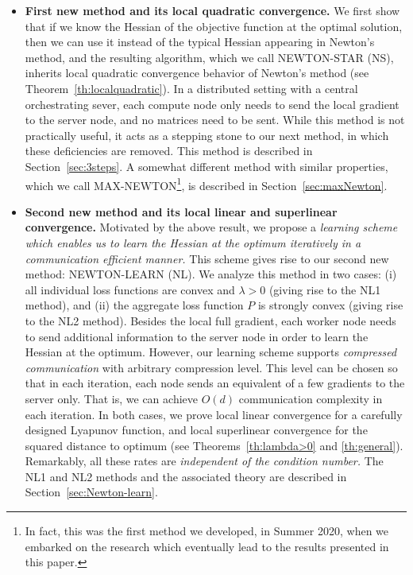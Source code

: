 \documentclass[10pt]{article}
\begin{document}
\begin{itemize}
\item {\bf First new method and its local quadratic convergence.} We first show that if we know the Hessian of the objective function at   the optimal solution, then we can use it instead of the typical Hessian appearing in Newton's method, and the resulting algorithm, which we call {\sf NEWTON-STAR (NS)}, inherits  local quadratic convergence behavior of Newton's method (see Theorem~\ref{th:localquadratic}). In a distributed setting with a central orchestrating sever, each compute node only needs to send the local  gradient  to the server  node, and no matrices need to be sent. While this method is not practically useful, it acts as a stepping stone to our next method, in which these deficiencies are removed. This method is described in Section~\ref{sec:3steps}. A somewhat different method with similar properties, which we call {\sf MAX-NEWTON}\footnote{In fact, this was the first method we developed, in Summer 2020, when we embarked on the research which eventually lead to the results presented in this paper.}, is described in Section~\ref{sec:maxNewton}. 

\item  {\bf Second new method and its local linear and superlinear convergence.} Motivated by the above result, we propose a {\em learning scheme which enables us to learn the Hessian at the optimum iteratively  in a communication efficient manner.} This scheme gives rise to our second new method: {\sf NEWTON-LEARN (NL)}. We analyze this method in two cases: (i) all individual loss functions are convex and $\lambda >0$ (giving rise to the {\sf NL1} method), and (ii) the aggregate loss function $P$ is strongly convex (giving rise to the {\sf NL2} method). Besides the local full gradient, each worker node needs to send additional information to the server node in order to learn the Hessian at the optimum. However, our learning  scheme supports {\em compressed communication} with arbitrary compression level. This level can be chosen so that in each iteration, each node sends an equivalent of a few gradients to the server only. That is, we can achieve $O(d)$ communication complexity in each iteration. In both cases, we prove local linear convergence for a carefully designed Lyapunov function, and  local superlinear convergence for the squared distance to optimum (see Theorems~\ref{th:lambda>0} and \ref{th:general}). Remarkably, all these rates are {\em independent of the condition number.} The {\sf NL1} and {\sf NL2} methods and the associated theory are described in Section~\ref{sec:Newton-learn}.


\end{itemize}
\end{document}
